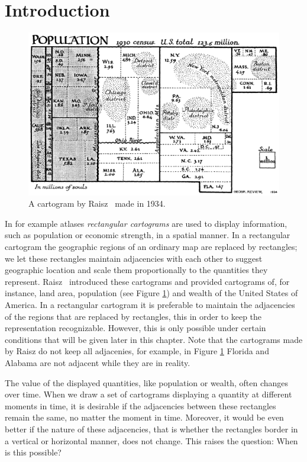 
\section{Introduction}
\thispagestyle{plain}


  \begin{figure}[!t]
    \centering
    \includegraphics[scale=.5]{introduction/img/cartogram.png}
    \caption{A cartogram by Raisz~\cite{Raisz1934} made in 1934.}
    \label{fig:intro:raisz}
  \end{figure}
  In for example atlases \emph{rectangular cartograms} are used to display information, such as population or economic strength, in a spatial manner.
  In a rectangular cartogram  the geographic regions of an ordinary map are replaced by rectangles; we let these rectangles maintain adjacencies with each other to suggest geographic location and scale them proportionally to the quantities they represent.
  Raisz~\cite{Raisz1934} introduced these cartograms and provided cartograms of, for instance, land area, population (see Figure  \ref{fig:intro:raisz}) and wealth of the United States of America.
  In a rectangular cartogram it is preferable to maintain the adjacencies of the regions that are replaced by rectangles, this in order to keep the representation recognizable.
  However, this is only possible under certain conditions that will be given later in this chapter.
  Note that the cartograms made by Raisz do not keep all adjacenies, for example, in Figure \ref{fig:intro:raisz} Florida and Alabama are not adjacent while they are in reality.

  The value of the displayed quantities, like population or wealth, often changes over time.
  When we draw a set of cartograms displaying a quantity at different moments in time, it is desirable if the adjacencies between these rectangles remain the same, no matter the moment in time.
  Moreover, it would be even better if the nature of these adjacencies, that is whether the rectangles border in a vertical or horizontal manner, does not change.
  This raises the question: When is this possible?

